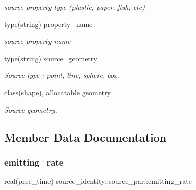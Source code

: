 \begin{DoxyCompactItemize}
\begin{DoxyCompactList}\small\item\em source property type (plastic, paper, fish, etc) \end{DoxyCompactList}\item 
type(string) \mbox{\hyperlink{structsource__identity_1_1source__par_a0205c62b7673e76c7f1de2bfcecabd84}{property\+\_\+name}}
\begin{DoxyCompactList}\small\item\em source property name \end{DoxyCompactList}\item 
type(string) \mbox{\hyperlink{structsource__identity_1_1source__par_a088f264b78200deb737b873025837ec6}{source\+\_\+geometry}}
\begin{DoxyCompactList}\small\item\em Source type \+: \textquotesingle{}point\textquotesingle{}, \textquotesingle{}line\textquotesingle{}, \textquotesingle{}sphere\textquotesingle{}, \textquotesingle{}box\textquotesingle{}. \end{DoxyCompactList}\item 
class(\mbox{\hyperlink{structgeometry_1_1shape}{shape}}), allocatable \mbox{\hyperlink{structsource__identity_1_1source__par_a96d4d1aebbc4cf365220f0bf0eabca97}{geometry}}
\begin{DoxyCompactList}\small\item\em Source geometry. \end{DoxyCompactList}\end{DoxyCompactItemize}


\subsection{Member Data Documentation}
\mbox{\label{structsource__identity_1_1source__par_a746a02960ffcba9f699ae45fa55dd8b4}} 
\subsubsection{\texorpdfstring{emitting\+\_\+rate}{emitting\_rate}}
{\footnotesize\ttfamily real(prec\+\_\+time) source\+\_\+identity\+::source\+\_\+par\+::emitting\+\_\+rate\hspace{0.3cm}{\ttfamily [private]}}



